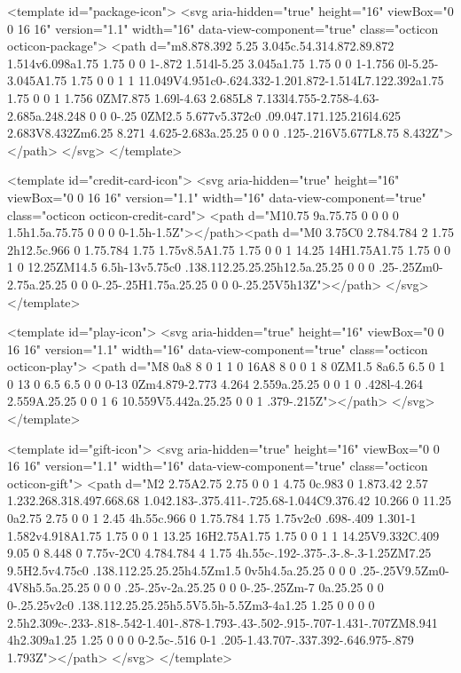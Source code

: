 {{<template id="package-icon">
  <svg aria-hidden="true" height="16" viewBox="0 0 16 16" version="1.1" width="16" data-view-component="true" class="octicon octicon-package">
    <path d="m8.878.392 5.25 3.045c.54.314.872.89.872 1.514v6.098a1.75 1.75 0 0 1-.872 1.514l-5.25 3.045a1.75 1.75 0 0 1-1.756 0l-5.25-3.045A1.75 1.75 0 0 1 1 11.049V4.951c0-.624.332-1.201.872-1.514L7.122.392a1.75 1.75 0 0 1 1.756 0ZM7.875 1.69l-4.63 2.685L8 7.133l4.755-2.758-4.63-2.685a.248.248 0 0 0-.25 0ZM2.5 5.677v5.372c0 .09.047.171.125.216l4.625 2.683V8.432Zm6.25 8.271 4.625-2.683a.25.25 0 0 0 .125-.216V5.677L8.75 8.432Z"></path>
</svg>
</template>

<template id="credit-card-icon">
  <svg aria-hidden="true" height="16" viewBox="0 0 16 16" version="1.1" width="16" data-view-component="true" class="octicon octicon-credit-card">
    <path d="M10.75 9a.75.75 0 0 0 0 1.5h1.5a.75.75 0 0 0 0-1.5h-1.5Z"></path><path d="M0 3.75C0 2.784.784 2 1.75 2h12.5c.966 0 1.75.784 1.75 1.75v8.5A1.75 1.75 0 0 1 14.25 14H1.75A1.75 1.75 0 0 1 0 12.25ZM14.5 6.5h-13v5.75c0 .138.112.25.25.25h12.5a.25.25 0 0 0 .25-.25Zm0-2.75a.25.25 0 0 0-.25-.25H1.75a.25.25 0 0 0-.25.25V5h13Z"></path>
</svg>
</template>

<template id="play-icon">
  <svg aria-hidden="true" height="16" viewBox="0 0 16 16" version="1.1" width="16" data-view-component="true" class="octicon octicon-play">
    <path d="M8 0a8 8 0 1 1 0 16A8 8 0 0 1 8 0ZM1.5 8a6.5 6.5 0 1 0 13 0 6.5 6.5 0 0 0-13 0Zm4.879-2.773 4.264 2.559a.25.25 0 0 1 0 .428l-4.264 2.559A.25.25 0 0 1 6 10.559V5.442a.25.25 0 0 1 .379-.215Z"></path>
</svg>
</template>

<template id="gift-icon">
  <svg aria-hidden="true" height="16" viewBox="0 0 16 16" version="1.1" width="16" data-view-component="true" class="octicon octicon-gift">
    <path d="M2 2.75A2.75 2.75 0 0 1 4.75 0c.983 0 1.873.42 2.57 1.232.268.318.497.668.68 1.042.183-.375.411-.725.68-1.044C9.376.42 10.266 0 11.25 0a2.75 2.75 0 0 1 2.45 4h.55c.966 0 1.75.784 1.75 1.75v2c0 .698-.409 1.301-1 1.582v4.918A1.75 1.75 0 0 1 13.25 16H2.75A1.75 1.75 0 0 1 1 14.25V9.332C.409 9.05 0 8.448 0 7.75v-2C0 4.784.784 4 1.75 4h.55c-.192-.375-.3-.8-.3-1.25ZM7.25 9.5H2.5v4.75c0 .138.112.25.25.25h4.5Zm1.5 0v5h4.5a.25.25 0 0 0 .25-.25V9.5Zm0-4V8h5.5a.25.25 0 0 0 .25-.25v-2a.25.25 0 0 0-.25-.25Zm-7 0a.25.25 0 0 0-.25.25v2c0 .138.112.25.25.25h5.5V5.5h-5.5Zm3-4a1.25 1.25 0 0 0 0 2.5h2.309c-.233-.818-.542-1.401-.878-1.793-.43-.502-.915-.707-1.431-.707ZM8.941 4h2.309a1.25 1.25 0 0 0 0-2.5c-.516 0-1 .205-1.43.707-.337.392-.646.975-.879 1.793Z"></path>
</svg>
</template>

}}
